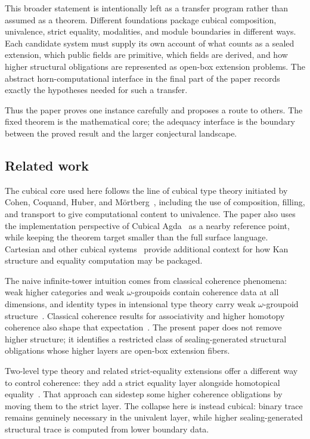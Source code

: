 \documentclass{lmcs}
\begin{document}
This broader statement is intentionally left as a transfer program rather than
assumed as a theorem.  Different foundations package cubical composition,
univalence, strict equality, modalities, and module boundaries in different ways.
Each candidate system must supply its own account of what counts as a sealed
extension, which public fields are primitive, which fields are derived, and how
higher structural obligations are represented as open-box extension problems.
The abstract horn-computational interface in the final part of the paper records
exactly the hypotheses needed for such a transfer.

Thus the paper proves one instance carefully and proposes a route to others.  The
fixed theorem is the mathematical core; the adequacy interface is the boundary
between the proved result and the larger conjectural landscape.

\subsection{Related work}
\label{subsec:related-work}

The cubical core used here follows the line of cubical type theory initiated by
Cohen, Coquand, Huber, and M{\"o}rtberg~\cite{cubical}, including the use of
composition, filling, and transport to give computational content to
univalence.  The paper also uses the implementation perspective of Cubical
Agda~\cite{cubical-agda} as a nearby reference point, while keeping the theorem
target smaller than the full surface language.  Cartesian and other cubical
systems~\cite{cartesian-cubical,xtt} provide additional context for how Kan
structure and equality computation may be packaged.

The naive infinite-tower intuition comes from classical coherence phenomena:
weak higher categories and weak \(\omega\)-groupoids contain coherence data at
all dimensions, and identity types in intensional type theory carry weak
\(\omega\)-groupoid structure~\cite{lumsdaine,vdberg-garner}.  Classical
coherence results for associativity and higher homotopy coherence also shape
that expectation~\cite{maclane-coherence,stasheff-i,stasheff-ii,kraus-vonraumer}.  The present
paper does not remove higher structure; it identifies a restricted class of
sealing-generated structural obligations whose higher layers are open-box
extension fibers.

Two-level type theory and related strict-equality extensions offer a different
way to control coherence: they add a strict equality layer alongside homotopical
equality~\cite{altenkirch-strict,annenkov-2ltt}.  That approach can sidestep
some higher coherence obligations by moving them to the strict layer.  The
collapse here is instead cubical: binary trace remains genuinely necessary in
the univalent layer, while higher sealing-generated structural trace is computed
from lower boundary data.
\end{document}
